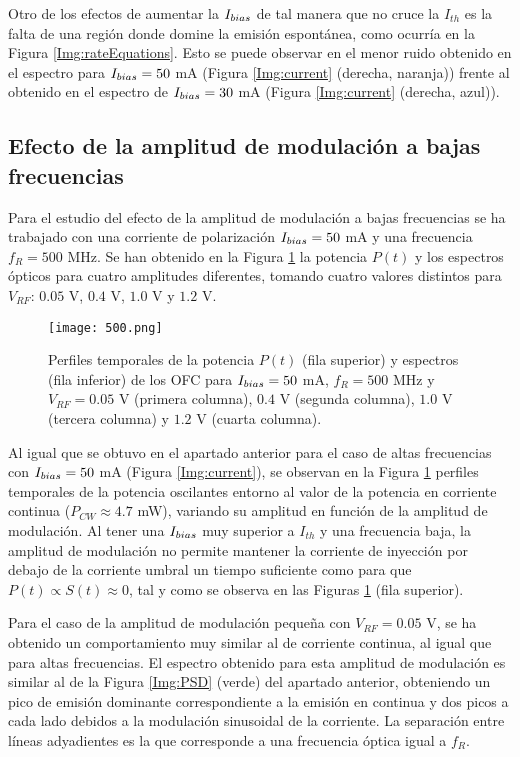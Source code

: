 		Otro de los efectos de aumentar la $I_{bias}$ de tal manera que no cruce la $I_{th}$ es la falta de una regi\'on donde domine la emisi\'on espont\'anea, como ocurría en la Figura \ref{Img:rateEquations}. Esto se puede observar en el menor ruido obtenido en el espectro para $I_{bias} = 50$ mA (Figura \ref{Img:current} (derecha, naranja)) frente al obtenido en el espectro de $I_{bias} = 30$ mA (Figura \ref{Img:current} (derecha, azul)).

	\subsection{Efecto de la amplitud de modulación a bajas frecuencias}
		\label{Sol:OFC:LwFreq}

		Para el estudio del efecto de la amplitud de modulación a bajas frecuencias se ha trabajado con una corriente de polarización $I_{bias} = 50$ mA y una frecuencia $f_R = 500$ MHz. Se han obtenido en la Figura \ref{Img:500} la potencia $P(t)$ y los espectros ópticos para cuatro amplitudes diferentes, tomando cuatro valores distintos para $V_{RF}$: $0.05$ V, $0.4$ V, $1.0$ V y $1.2$ V.

			\begin{figure}[H]
				\centering
				\texttt{[image: 500.png]}
				\vspace{-0.5cm}
				\caption{\label{Img:500}Perfiles temporales de la potencia $P(t)$ (fila superior) y espectros (fila inferior) de los OFC para $I_{bias} = 50$ mA, $f_R = 500$ MHz y $V_{RF} = 0.05$ V (primera columna), $0.4$ V (segunda columna), $1.0$ V (tercera columna) y $1.2$ V (cuarta columna).}	
			\end{figure}

		Al igual que se obtuvo en el apartado anterior para el caso de altas frecuencias con $I_{bias} = 50$ mA (Figura \ref{Img:current}), se observan en la Figura \ref{Img:500} perfiles temporales de la potencia oscilantes entorno al valor de la potencia en corriente continua ($P_{CW} \approx 4.7$ mW), variando su amplitud en funci\'on de la amplitud de modulación. Al tener una $I_{bias}$ muy superior a $I_{th}$ y una frecuencia baja, la amplitud de modulaci\'on no permite mantener la corriente de inyecci\'on por debajo de la corriente umbral un tiempo suficiente como para que $P(t) \propto S(t) \approx 0$, tal y como se observa en las Figuras \ref{Img:500} (fila superior).

		Para el caso de la amplitud de modulaci\'on pequeña con $V_{RF} = 0.05$ V, se ha obtenido un comportamiento muy similar al de corriente continua, al igual que para altas frecuencias. El espectro obtenido para esta amplitud de modulaci\'on es similar al de la Figura \ref{Img:PSD} (verde) del apartado anterior, obteniendo un pico de emisi\'on dominante correspondiente a la emisi\'on en continua y dos picos a cada lado debidos a la modulación sinusoidal de la corriente. La separación entre líneas adyadientes es la que corresponde a una frecuencia óptica igual a $f_R$.

